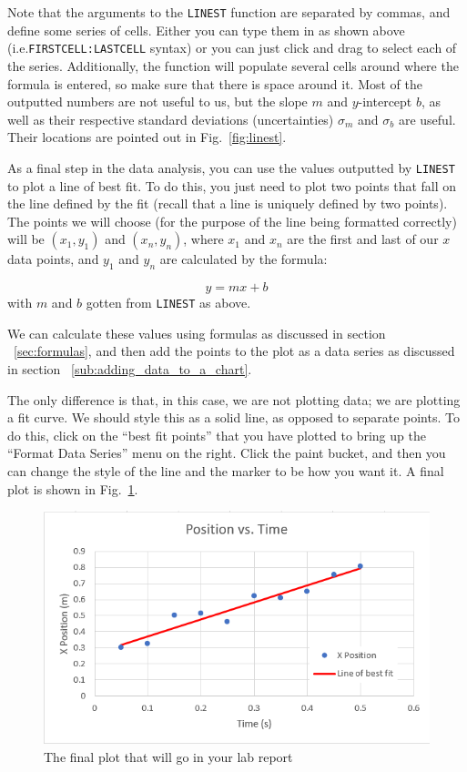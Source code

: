 \documentclass[10pt]{article}
\begin{document}
Note that the arguments to the \texttt{LINEST} function are separated by commas, and define some series of cells. Either you can type them in as shown above (i.e.\texttt{FIRSTCELL:LASTCELL} syntax) or you can just click and drag to select each of the series. Additionally, the function will populate several cells around where the formula is entered, so make sure that there is space around it. Most of the outputted numbers are not useful to us, but the slope $m$ and $y$-intercept $b$, as well as their respective standard deviations (uncertainties) $\sigma_m$ and $\sigma_b$ are useful. Their locations are pointed out in Fig.~\ref{fig:linest}.

As a final step in the data analysis, you can use the values outputted by \texttt{LINEST} to plot a line of best fit. To do this, you just need to plot two points that fall on the line defined by the fit (recall that a line is uniquely defined by two points). The points we will choose (for the purpose of the line being formatted correctly) will be $(x_1, y_1)$ and $(x_n, y_n)$, where $x_1$ and $x_n$ are the first and last of our $x$ data points, and $y_1$ and $y_n$ are calculated by the formula:

\[
y = mx + b
\]
with $m$ and $b$ gotten from \texttt{LINEST} as above.

We can calculate these values using formulas as discussed in section ~\ref{sec:formulas}, and then add the points to the plot as a data series as discussed in section ~\ref{sub:adding_data_to_a_chart}.

The only difference is that, in this case, we are not plotting data; we are plotting a fit curve. We should style this as a solid line, as opposed to separate points. To do this, click on the ``best fit points'' that you have plotted to bring up the ``Format Data Series'' menu on the right. Click the paint bucket, and then you can change the style of the line and the marker to be how you want it. A final plot is shown in Fig.~\ref{fig:images_finished-plot}.

\begin{figure}[htpb]
	\centering
	\includegraphics[width=0.8\linewidth]{images/finished-plot.png}
	\caption{The final plot that will go in your lab report}%
	\label{fig:images_finished-plot}
\end{figure}
\end{document}

